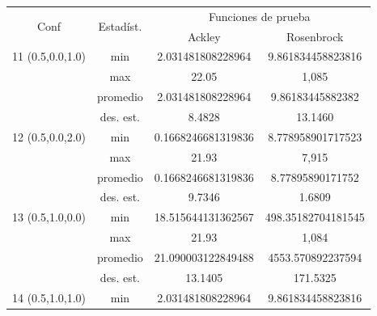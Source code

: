 \documentclass{report}
\begin{document}
    \begin{table}[H]
        \centering
        \begin{tabular}{|c|c|c|c|}
        \hline
        \multirow{2}{*}{Conf} & \multirow{2}{*}{Estadíst.} & \multicolumn{2}{c|}{Funciones de prueba} \\ \cline{3-4}
                            &                             & Ackley & Rosenbrock \\ \hline

        11 (0.5,0.0,1.0)  & min                         &      2.031481808228964      &   9.861834458823816     \\ \cline{2-4} 
                              & max                         &     22.05       &   1,085     \\ \cline{2-4} 
                              & promedio                    &       2.031481808228964     &    9.86183445882382    \\ \cline{2-4} 
                              & des. est.                   &  8.4828          &  13.1460      \\ \hline
        12 (0.5,0.0,2.0)                   & min                         &     0.1668246681319836       &   8.778958901717523     \\ \cline{2-4} 
                              & max                         &       21.93     &   7,915     \\ \cline{2-4} 
                              & promedio                    &      0.1668246681319836      &     8.77895890171752    \\ \cline{2-4} 
                              & des. est.                   &    9.7346        &    1.6809    \\ \hline
        13 (0.5,1.0,0.0)                   & min                         &       18.515644131362567     &   498.35182704181545     \\ \cline{2-4} 
                              & max                         &     21.93       &   1,084     \\ \cline{2-4} 
                              & promedio                    &    21.090003122849488        &    4553.570892237594    \\ \cline{2-4} 
                              & des. est.                   &     13.1405       &  171.5325      \\ \hline
        14 (0.5,1.0,1.0)                   & min                         &      2.031481808228964      &  9.861834458823816      \\ \cline{2-4} 

\end{tabular}
\end{table}
\end{document}
